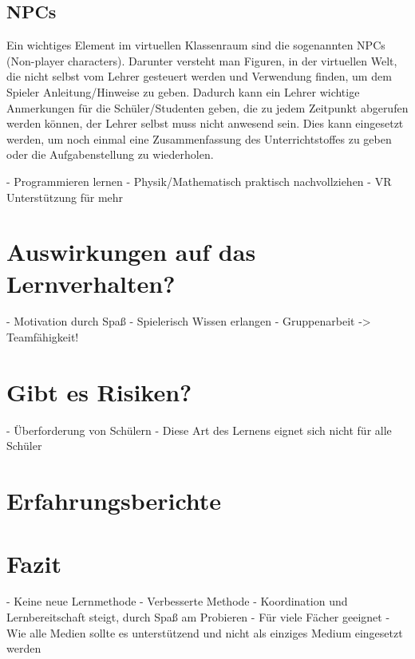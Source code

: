 \subsection{NPCs}
Ein wichtiges Element im virtuellen Klassenraum sind die sogenannten NPCs (Non-player characters).
Darunter versteht man Figuren, in der virtuellen Welt, die nicht selbst vom Lehrer gesteuert werden und Verwendung finden, um dem Spieler Anleitung/Hinweise zu geben. Dadurch kann ein Lehrer wichtige Anmerkungen für die Schüler/Studenten geben, die zu jedem Zeitpunkt abgerufen werden können, der Lehrer selbst muss nicht anwesend sein.
Dies kann eingesetzt werden, um noch einmal eine Zusammenfassung des Unterrichtstoffes zu geben oder die Aufgabenstellung zu wiederholen. 

- Programmieren lernen
- Physik/Mathematisch praktisch nachvollziehen
- VR Unterstützung für mehr 
\section{Auswirkungen auf das Lernverhalten?}
- Motivation durch Spaß
- Spielerisch Wissen erlangen
- Gruppenarbeit -> Teamfähigkeit!
\section{Gibt es Risiken?}
- Überforderung von Schülern
- Diese Art des Lernens eignet sich nicht für alle Schüler
\section{Erfahrungsberichte}
\section{Fazit}
- Keine neue Lernmethode
- Verbesserte Methode
- Koordination und Lernbereitschaft steigt, durch Spaß am Probieren
- Für viele Fächer geeignet
- Wie alle Medien sollte es unterstützend und nicht als einziges Medium eingesetzt werden